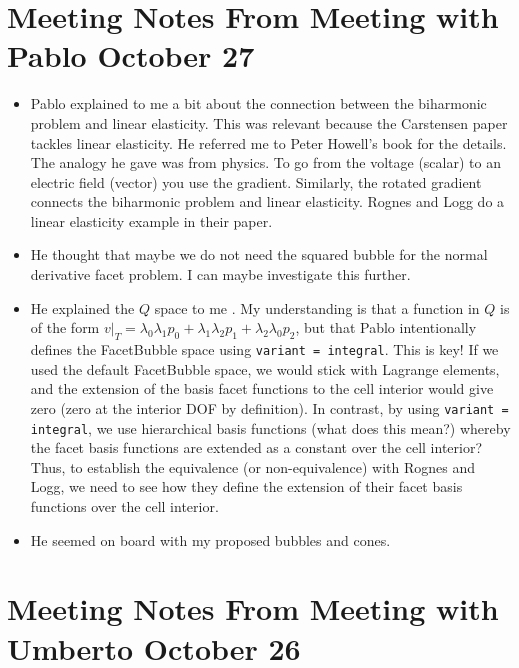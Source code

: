 \documentclass[12pt,a4paper]{article}
\begin{document}
\section{Meeting Notes From Meeting with Pablo October 27}

\begin{itemize}


\item Pablo explained to me a bit about the connection between the biharmonic problem and linear elasticity. This was relevant because the Carstensen paper tackles linear elasticity. He referred me to Peter Howell's book for the details. The analogy he gave was from physics. To go from the voltage (scalar) to an electric field (vector) you use the gradient. Similarly, the rotated gradient connects the biharmonic problem and linear elasticity. Rognes and Logg do a linear elasticity example in their paper. 

\item He thought that maybe we do not need the squared bubble for the normal derivative facet problem. I can maybe investigate this further. 

\item He explained the $Q$ space to me . My understanding is that a function in $Q$ is of the form $v |_T = \lambda_0 \lambda_1 p_0 + \lambda_1\lambda_2 p_1 + \lambda_2\lambda_0 p_2$, but that Pablo intentionally defines the FacetBubble space using \texttt{variant = integral}. This is key! If we used the default FacetBubble space, we would stick with Lagrange elements, and the extension of the basis facet functions to the cell interior would give zero (zero at the interior DOF by definition). In contrast, by using \texttt{variant = integral}, we use hierarchical basis functions (what does this mean?) whereby the facet basis functions are extended as a constant over the cell interior? Thus, to establish the equivalence (or non-equivalence) with Rognes and Logg, we need to see how they define the extension of their facet basis functions over the cell interior. 

\item He seemed on board with my proposed bubbles and cones. 

\end{itemize}

\section{Meeting Notes From Meeting with Umberto October 26}
\end{document}

